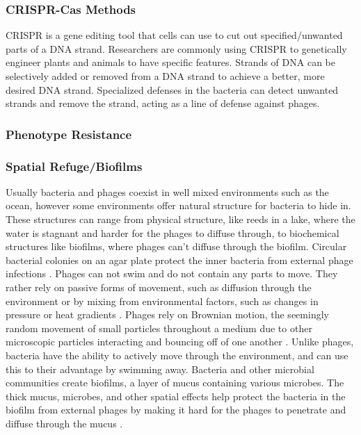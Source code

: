 \subsubsection{CRISPR-Cas Methods}
CRISPR is a gene editing tool that cells can use to cut out specified/unwanted parts of a DNA strand. 
Researchers are commonly using CRISPR to genetically engineer plants and animals to have specific features. 
Strands of DNA can be selectively added or removed from a DNA strand to achieve a better, more desired DNA strand. 
Specialized defenses in the bacteria can detect unwanted strands and remove the strand, acting as a line of defense against phages. 

\subsubsection{Phenotype Resistance}

\subsubsection{Spatial Refuge/Biofilms} 
Usually bacteria and phages coexist in well mixed environments such as the ocean, however some environments offer natural structure for bacteria to hide in. 
These structures can range from physical structure, like reeds in a lake, where the water is stagnant and harder for the phages to diffuse through, to biochemical structures like biofilms, where phages can't diffuse through the biofilm. \newline
Circular bacterial colonies on an agar plate protect the inner bacteria from external phage infections \cite{eriksenGrowingMicrocolonyCan2018}. 
Phages can not swim and do not contain any parts to move. 
They rather rely on passive forms of movement, such as diffusion through the environment or by mixing from environmental factors, such as changes in pressure or heat gradients \cite{lohrmannInfluenceBacterialSwimming2024}. 
Phages rely on Brownian motion, the seemingly random movement of small particles throughout a medium due to other microscopic particles interacting and bouncing off of one another \cite{moineauBacteriophage2013}. 
Unlike phages, bacteria have the ability to actively move through the environment, and can use this to their advantage by swimming away. 
Bacteria and other microbial communities create biofilms, a layer of mucus containing various microbes. 
The thick mucus, microbes, and other spatial effects help protect the bacteria in the biofilm from external phages by making it hard for the phages to penetrate and diffuse through the mucus \cite{abedonPhageDelayEnhancing2017}. 

